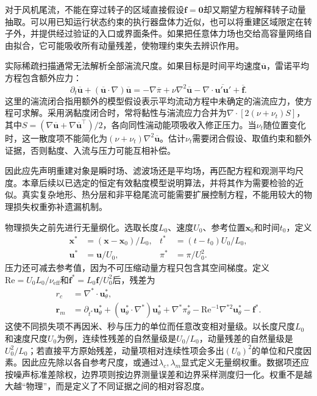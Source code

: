 对于风机尾流，不能在穿过转子的区域直接假设$\mathbf f=\mathbf0$却又期望方程解释转子动量抽取。可以用已知运行状态约束的执行器盘体力近似，也可以将重建区域限定在转子外，并提供经过验证的入口或界面条件。如果把任意体力场也交给高容量网络自由拟合，它可能吸收所有动量残差，使物理约束失去辨识作用。

实际稀疏扫描通常无法解析全部湍流尺度。如果目标是时间平均速度$\overline{\mathbf u}$，雷诺平均方程包含额外应力：
\begin{equation}
 \partial_t\overline{\mathbf u}
 +(\overline{\mathbf u}\cdot\nabla)\overline{\mathbf u}
 =-\nabla\overline\pi+\nu\nabla^2\overline{\mathbf u}
 -\nabla\cdot\overline{\mathbf u'\mathbf u'}+\overline{\mathbf f}.
\end{equation}
这里的湍流闭合指用额外的模型假设表示平均流动方程中未确定的湍流应力，使方程可求解。采用涡黏度闭合时，常将黏性与湍流应力合并为$\nabla\cdot[2(\nu+\nu_t)S]$，其中$S=(\nabla\overline{\mathbf u}+\nabla\overline{\mathbf u}^{\top})/2$，各向同性湍动能项吸收入修正压力。当$\nu_t$随位置变化时，这一散度项不能简化为$(\nu+\nu_t)\nabla^2\overline{\mathbf u}$。估计$\nu_t$需要闭合假设、取值约束和额外证据，否则黏度、入流与压力可能互相补偿。

因此应先声明重建对象是瞬时场、滤波场还是平均场，再匹配方程和观测平均尺度。本章后续以已选定的恒定有效黏度模型说明算法，并将其作为需要检验的近似。真实复杂地形、热分层和非平稳尾流可能需要扩展控制方程，不能用较大的物理损失权重弥补遗漏机制。

物理损失之前先进行无量纲化。选取长度$L_0$、速度$U_0$、参考位置$\mathbf x_0$和时间$t_0$，定义
\begin{align}
 \mathbf x^*&=(\mathbf x-\mathbf x_0)/L_0,&
 t^*&=(t-t_0)U_0/L_0,\\
 \mathbf u^*&=\mathbf u/U_0,&
 \pi^*&=\pi/U_0^2.
\end{align}
压力还可减去参考值，因为不可压缩动量方程只包含其空间梯度。定义$\mathrm{Re}=U_0L_0/\nu_{\mathrm{eff}}$和$\mathbf f^*=L_0\mathbf f/U_0^2$后，残差为
\begin{align}
 r_c&=\nabla^*\cdot\mathbf u_\theta^*,\\
 \mathbf r_m&=\partial_{t^*}\mathbf u_\theta^*
 +(\mathbf u_\theta^*\cdot\nabla^*)\mathbf u_\theta^*
 +\nabla^*\pi_\theta^*
 -\mathrm{Re}^{-1}\nabla^{*2}\mathbf u_\theta^*-\mathbf f^*.
 \label{eq:pinn-momentum}
\end{align}
这使不同损失项不再因米、秒与压力的单位而任意改变相对量级。以长度尺度$L_0$和速度尺度$U_0$为例，连续性残差的自然量级是$U_0/L_0$，动量残差的自然量级是$U_0^2/L_0$；若直接平方原始残差，动量项相对连续性项会多出$(U_0)^2$的单位和尺度因素。因此应先除以各自参考尺度，或通过$\lambda_c,\lambda_m$显式定义无量纲权重。数据项还应按噪声标准差除权，边界项则按边界测量误差和边界采样测度归一化。权重不是越大越“物理”，而是定义了不同证据之间的相对容忍度。

